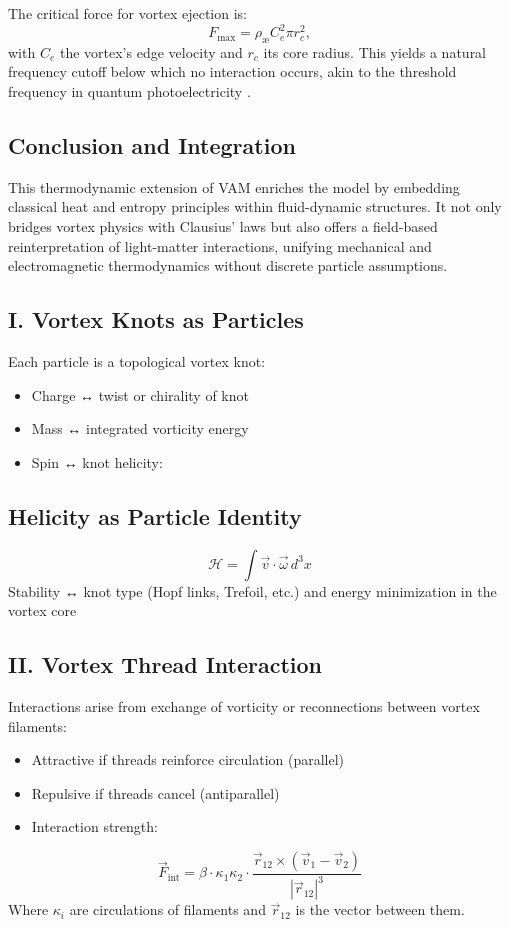 The critical force for vortex ejection is:
\begin{equation}
F_{\text{max}} = \rho_{\text{\ae}} C_e^2 \pi r_c^2,
\end{equation}
with $C_e$ the vortex's edge velocity and $r_c$ its core radius. This yields a natural frequency cutoff below which no interaction occurs, akin to the threshold frequency in quantum photoelectricity \cite{einstein1905photoelectric}.

\subsection{Conclusion and Integration}

This thermodynamic extension of VAM enriches the model by embedding classical heat and entropy principles within fluid-dynamic structures. It not only bridges vortex physics with Clausius' laws but also offers a field-based reinterpretation of light-matter interactions, unifying mechanical and electromagnetic thermodynamics without discrete particle assumptions.






\subsection*{I. Vortex Knots as Particles}
Each particle is a topological vortex knot:
\begin{itemize}
    \item Charge ↔ twist or chirality of knot
    \item Mass ↔ integrated vorticity energy
    \item Spin ↔ knot helicity:
\end{itemize}
\subsection*{Helicity as Particle Identity}
\begin{equation}
    \mathcal{H} = \int \vec{v} \cdot \vec{\omega} \, d^3x
\end{equation}
Stability ↔ knot type (Hopf links, Trefoil, etc.) and energy minimization in the vortex core

\subsection*{II. Vortex Thread Interaction}
Interactions arise from exchange of vorticity or reconnections between vortex filaments:
\begin{itemize}
    \item Attractive if threads reinforce circulation (parallel)
    \item Repulsive if threads cancel (antiparallel)
    \item Interaction strength:
\end{itemize}
\begin{equation}
    \vec{F}_{\text{int}} = \beta \cdot \kappa_1 \kappa_2 \cdot \frac{\vec{r}_{12} \times (\vec{v}_1 - \vec{v}_2)}{|\vec{r}_{12}|^3}
\end{equation}
Where \(\kappa_i\) are circulations of filaments and \(\vec{r}_{12}\) is the vector between them.


